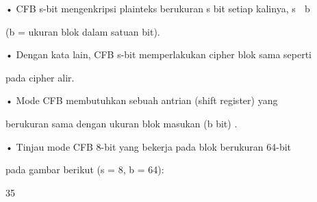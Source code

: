 \documentclass{article}
\begin{document}

• CFB s-bit mengenkripsi plainteks berukuran s bit setiap kalinya, s  b  

(b = ukuran blok dalam satuan bit).

• Dengan kata lain, CFB s-bit memperlakukan cipher blok sama seperti 

pada cipher alir.

• Mode CFB membutuhkan sebuah antrian (shift register) yang 

berukuran sama dengan ukuran blok masukan (b bit) . 

• Tinjau mode CFB 8-bit yang bekerja pada blok berukuran 64-bit  

pada gambar berikut (s = 8, b = 64):

35
\end{document}
